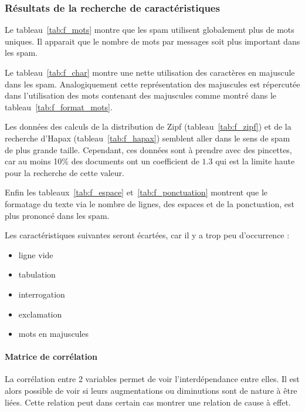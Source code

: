     \subsubsection*{Résultats de la recherche de caractéristiques}
        
        Le tableau~\ref{tab:f_mots} montre que les spam utilisent globalement plus de mots uniques.
        Il apparait que le nombre de mots par messages soit plus important dans les spam.

        
        Le tableau~\ref{tab:f_char} montre une nette utilisation des caractères en majuscule dans les spam.
        Analogiquement cette représentation des majuscules est répercutée dans l'utilisation des mots contenant des majuscules comme montré dans le tableau~\ref{tab:f_format_mots}.
        

        Les données des calculs de la distribution de Zipf (tableau~\ref{tab:f_zipf}) et
        de la recherche d'Hapax (tableau~\ref{tab:f_hapax}) semblent aller dans le sens de spam de plus grande taille.
        Cependant, ces données sont à prendre avec des pincettes, car au moins 10\% des documents ont un coefficient de $1.3$ qui est la limite haute pour la recherche de cette valeur.
        
        

        Enfin les tableaux~\ref{tab:f_espace} et~\ref{tab:f_ponctuation} montrent que le formatage du texte via le nombre de lignes, des espaces et de la ponctuation, est plus prononcé dans les spam.
        
        

        Les caractéristiques suivantes seront écartées, car il y a trop peu d'occurrence :
        \begin{itemize}
            \item ligne vide
            \item tabulation
            \item interrogation
            \item exclamation
            \item mots en majuscules
        \end{itemize}

        \paragraph{Matrice de corrélation}
            La corrélation entre 2 variables permet de voir l'interdépendance entre elles.
            Il est alors possible de voir si leurs augmentations ou diminutions sont de nature à être liées.
            Cette relation peut dans certain cas montrer une relation de cause à effet.

